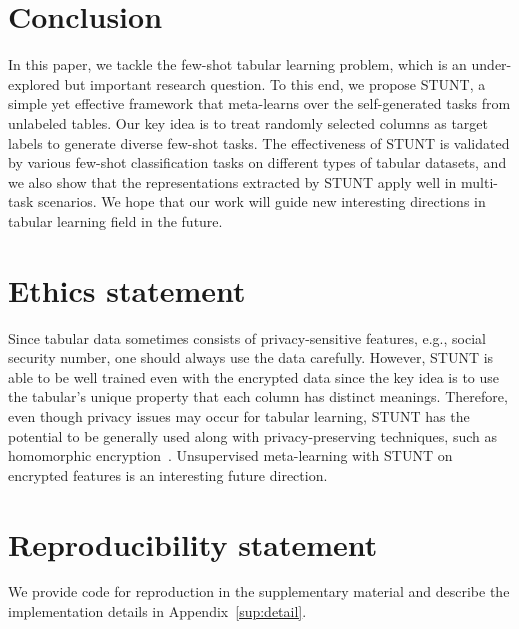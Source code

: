 \section{Conclusion}

In this paper, we tackle the few-shot tabular learning problem, which is an under-explored but important research question. To this end, we propose STUNT, a simple yet effective framework that meta-learns over the self-generated tasks from unlabeled tables. Our key idea is to treat randomly selected columns as target labels to generate diverse few-shot tasks. The effectiveness of STUNT is validated by various few-shot classification tasks on different types of tabular datasets, and we also show that the representations extracted by STUNT apply well in multi-task scenarios. We hope that our work will guide new interesting directions in tabular learning field in the future.

\section*{Ethics statement} Since tabular data sometimes consists of privacy-sensitive features, e.g., social security number, one should always use the data carefully. However, STUNT is able to be well trained even with the encrypted data since the key idea is to use the tabular's unique property that each column has distinct meanings. Therefore, even though privacy issues may occur for tabular learning, STUNT has the potential to be generally used along with privacy-preserving techniques, such as homomorphic encryption~\citep{cheon2017homomorphic}. Unsupervised meta-learning with STUNT on encrypted features is an interesting future direction.

\section*{Reproducibility statement} We provide code for reproduction in the supplementary material and describe the implementation details in Appendix~\ref{sup:detail}.


